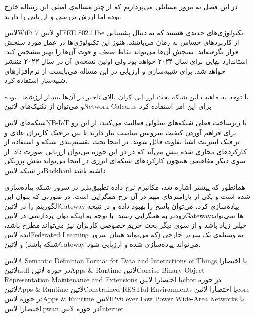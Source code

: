 
در این فصل به مرور مسائلی می‌پردازیم که از چتر مساله‌ی اصلی این رساله خارج بوده اما ارزش بررسی و ارزیابی را دارند.



‌لاتین{WiFi 7} و ‌لاتین{IEEE 802.11be} تکنولوژی‌های جدیدی هستند که به دنبال پشتیبانی از کاربردهای حساس به زمان می‌باشند. هنوز این تکنولوژی‌ها در عمل مورد سنجش قرار نگرفته‌اند.
سنجش آن‌ها می‌تواند نقاط ضعف و قوت آن‌ها را بهتر مشخص کند. استاندارد نهایی برای سال ۲۰۲۴ خواهد بود ولی اولین نسخه‌ی آن در سال ۲۰۲۲ منتشر خواهد شد. برای شبیه‌سازی و ارزیابی در این
مساله می‌بایست از نرم‌افزارهای شبیه‌ساز استفاده کرد.

با توجه به ماهیت این شبکه بحث ارزیابی کران بالای تاخیر در آن‌ها بسیار ارزشمند بوده و می‌توان از تکنیک‌های ‌لاتین{Network Calculus} برای این امر استفاده کرد.


شبکه‌های ‌لاتین{NB-IoT} با زیرساخت فعلی شبکه‌های سلولی فعالیت می‌کنند، از این رو برای فراهم آوردن کیفیت سرویس مناسب نیاز دارند تا بین ترافیک کاربران عادی
و ترافیک اینترنت اشیا تفاوت قائل شوند. در اینجا بحث تقسیم‌بندی شبکه و استفاده از کارکردهای مجازی شده پیش می‌آید که در در این حوزه می‌توان ارزیابی صورت داد.
از سوی دیگر مفاهیمی همچون کارکردهای شبکه‌ای ابرزی در اینجا می‌تواند نقش پررنگی در شبکه ‌لاتین{Backhaul} داشته باشد.


همانطور که پیشتر اشاره شد، مکانیزم نرخ داده تطبیق‌پذیر در سرور شبکه پیاده‌سازی شده است و یکی از پارامترهای مهم در آن نرخ همگرایی است.
در صورتی که بتوان این الگوریتم را در ‌لاتین{Gateway} پیاده‌سازی کرد، می‌توان پاسخ را بهبود داده و در نتیجه زودتر به همگرایی رسید.
با توجه به اینکه توان پردازشی در ‌لاتین{Gateway}ها نمی‌تواند خیلی زیاد باشد و از سوی دیگر بحث حریم خصوصی کاربران نیز می‌تواند مطرح باشد،
ایده ‌لاتین{Federated Learning} به وسیله‌ی یک سرور خارجی (که می‌تواند همان سرور شبکه باشد) و ‌لاتین{Gateway} می‌تواند پیاده‌سازی شده
و ارزیابی شود.


 ‌لاتین{A Semantic Definition Format for Data and Interactions of Things} یا اختصارا ‌لاتین{asdf} در حوزه ‌لاتین{Apps \& Runtime}
 ‌لاتین{Concise Binary Object Representation Maintenance and Extensions} یا اختصارا ‌لاتین{cbor} در حوزه ‌لاتین{Apps \& Runtime}
 ‌لاتین{Constrained RESTful Environments} یا اختصارا ‌لاتین{core} در حوزه ‌لاتین{Apps \& Runtime}
 ‌لاتین{IPv6 over Low Power Wide-Area Networks} یا اختصارا ‌لاتین{lpwan} در حوزه ‌لاتین{Internet}

